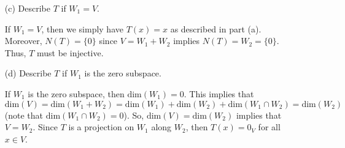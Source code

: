 \begin{enumerate}
\begin{proof}
        Now, let's show that \( W_{2} = N(T) \). Let \( x \in W_{2} \). Since \( T  \) is a projection on \( W_{1} \) along \( W_{2} \), we have \( x = 0_{V} + x \) implies \( T(x) = 0_{V} \). This tell us that \( x \in N(T) \). On the other hand, assume \( x \in N(T) \). Then \( T(x) = 0_{V} \).
    Since \( x \in V  \) and \( W_{1} + W_{2} = V  \), we have \( x = x_{1} + x_{2}  \) with \( x_{1} \in W_{1} \) and \( x_{2} \in W_{2}  \). Since \( T(x) =  0_{V} \), either \( x_{1} = 0  \) or \( x_{2} = 0  \). Assume \( x_{2} = 0 \), then \( x = x_{1} \) and \(x \in W_{1}  \) which is a contradiction. If \( x_{1} = 0  \), then \( x_{2} = x  \), so \( T(x_{2}) = 0_{V}   \). Hence, \( x \in W_{2} \). Thus, 
    \[ W_{2} = N(T). \]
        \end{proof}

    \item[(c)] Describe \( T  \) if \( W_{1} = V  \).
        \begin{solution}
        If \( W_{1} = V  \), then we simply have \( T(x) = x  \) as described in part (a). Moreover, \( N(T) = \{ 0 \}  \) since \( V  = W_{1} + W_{2}  \) implies \( N(T) = W_{2} = \{ 0 \}  \). Thus, \( T \) must be injective. 
        \end{solution}
    \item[(d)] Describe \( T  \) if \( W_{1}  \) is the zero subspace.
        \begin{solution}
        If \( W_{1}  \) is the zero subspace, then \( \text{dim}(W_{1}) = 0  \). This implies that \( \text{dim}(V) = \text{dim}(W_{1} + W_{2}) = \text{dim}(W_{1}) + \text{dim}(W_{2}) + \text{dim}(W_{1} \cap W_{2}) = \text{dim}(W_{2}) \) (note that \( \text{dim}(W_{1} \cap W_{2}) = 0  \)). So, \( \text{dim}(V) = \text{dim}(W_{2})  \) implies that \( V = W_{2} \). Since \( T  \) is a projection on \( W_{1} \) along \( W_{2} \), then \( T(x) = 0_{V}  \) for all \( x \in V  \).
        \end{solution}
\end{enumerate}

